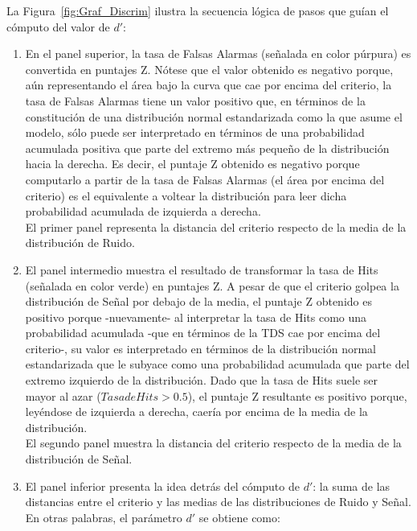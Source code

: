 \begin{itemize}
La Figura~\ref{fig:Graf_Discrim} ilustra la secuencia lógica de pasos que guían el cómputo del valor de $d'$:\\

\begin{enumerate}
\item En el panel superior, la tasa de Falsas Alarmas (señalada en color púrpura) es convertida en puntajes Z. Nótese que el valor obtenido es negativo porque, aún representando el área bajo la curva que cae por encima del criterio, la tasa de Falsas Alarmas tiene un valor positivo que, en términos de la constitución de una distribución normal estandarizada como la que asume el modelo, sólo puede ser interpretado en términos de una probabilidad acumulada positiva que parte del extremo más pequeño de la distribución hacia la derecha. Es decir, el puntaje Z obtenido es negativo porque computarlo a partir de la tasa de Falsas Alarmas (el área por encima del criterio) es el equivalente a voltear la distribución para leer dicha probabilidad acumulada de izquierda a derecha.\\

El primer panel representa la distancia del criterio respecto de la media de la distribución de Ruido.\\

\item El panel intermedio muestra el resultado de transformar la tasa de Hits (señalada en color verde) en puntajes Z. A pesar de que el criterio golpea la distribución de Señal por debajo de la media, el puntaje Z obtenido es positivo porque -nuevamente- al interpretar la tasa de Hits como una probabilidad acumulada -que en términos de la TDS cae por encima del criterio-, su valor es interpretado en términos de la distribución normal estandarizada que le subyace como una probabilidad acumulada que parte del extremo izquierdo de la distribución. Dado que la tasa de Hits suele ser mayor al azar ($TasadeHits > 0.5$), el puntaje Z resultante es positivo porque, leyéndose de izquierda a derecha, caería por encima de la media de la distribución.\\

El segundo panel muestra la distancia del criterio respecto de la media de la distribución de Señal.\\

\item El panel inferior presenta la idea detrás del cómputo de $d'$: la suma de las distancias entre el criterio y las medias de las distribuciones de Ruido y Señal. En otras palabras, el parámetro $d'$ se obtiene como:\\


\end{enumerate}
\end{itemize}

